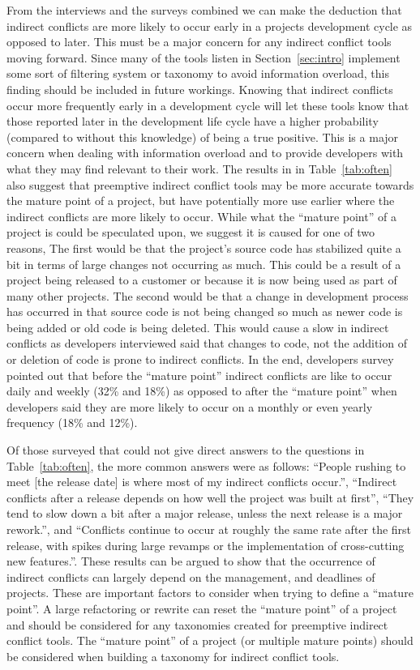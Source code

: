 \documentclass[conference]{IEEEtran}
\begin{document}
From the interviews and the surveys combined we can make the deduction that indirect conflicts are more likely to occur early 
in a projects development cycle as opposed to later. This must be a major concern for any indirect conflict tools moving forward. Since many
of the tools listen in Section~\ref{sec:intro} implement some sort of filtering system or taxonomy to avoid information overload, this
finding should be included in future workings. Knowing that indirect conflicts occur more frequently early in a development cycle will let
these tools know that those reported later in the development life cycle have a higher probability (compared to without this knowledge) of
being a true positive. This is a major concern when dealing with information overload and to provide developers with what they may find
relevant to their work. The results in in Table~\ref{tab:often} also suggest that preemptive indirect conflict tools may be more accurate
towards the mature point of a project, but have potentially more use earlier where the indirect conflicts are more likely to occur.
While what the ``mature point'' of a project is could be speculated upon, we suggest it is caused for one of two reasons, The
first would be that the project's source code has stabilized quite a bit in terms of large changes not occurring as much. This could be a result
of a project being released to a customer or because it is now being used as part of many other projects. The second would be that a change in
development process has occurred in that source code is not being changed so much as newer code is being added or old code is being deleted. This
would cause a slow in indirect conflicts as developers interviewed said that changes to code, not the addition of or deletion of code is prone
to indirect conflicts. In the end, developers survey pointed out that before the ``mature
point'' indirect conflicts are like to occur daily and weekly (32\% and 18\%) as opposed to after the ``mature point'' when developers
said they are more likely to occur on a monthly or even yearly frequency (18\% and 12\%).

Of those surveyed that could not give direct answers to the questions in Table~\ref{tab:often}, the more common answers were 
as follows: ``People rushing to meet [the release date] is where most of my indirect conflicts occur.'', ``Indirect conflicts
after a release depends on how well the project was built at first'', ``They tend to slow down a bit after a major release, 
unless the next release is a major rework.'', and ``Conflicts continue to occur at roughly the same rate after the first release,
with spikes during large revamps or the implementation of cross-cutting new features.''. These results can be argued to show that the occurrence
of indirect conflicts can largely depend on the management, and deadlines of projects. These are important factors to consider when trying
to define a ``mature point''. A large refactoring or rewrite can reset the ``mature point'' of a project and should be considered for
any taxonomies created for preemptive indirect conflict tools. The ``mature point'' of a project (or multiple mature points) should be
considered when building a taxonomy for indirect conflict tools.
\end{document}
